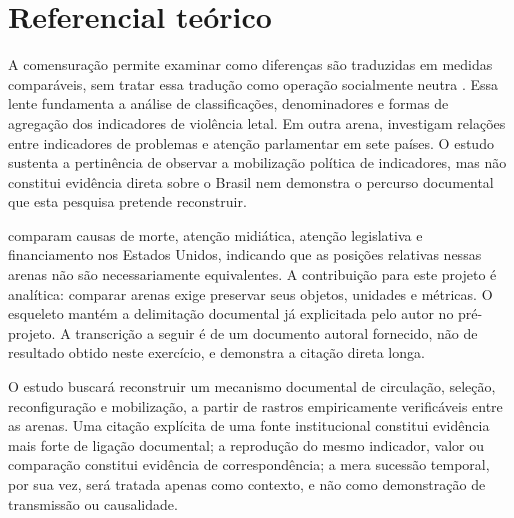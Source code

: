 \section{Referencial teórico}

A comensuração permite examinar como diferenças são traduzidas em medidas comparáveis, sem tratar essa tradução como operação socialmente neutra \cite{espeland1998comensuracao}. Essa lente fundamenta a análise de classificações, denominadores e formas de agregação dos indicadores de violência letal. Em outra arena,  investigam relações entre indicadores de problemas e atenção parlamentar em sete países. O estudo sustenta a pertinência de observar a mobilização política de indicadores, mas não constitui evidência direta sobre o Brasil nem demonstra o percurso documental que esta pesquisa pretende reconstruir.

 comparam causas de morte, atenção midiática, atenção legislativa e financiamento nos Estados Unidos, indicando que as posições relativas nessas arenas não são necessariamente equivalentes. A contribuição para este projeto é analítica: comparar arenas exige preservar seus objetos, unidades e métricas. O esqueleto mantém a delimitação documental já explicitada pelo autor no pré-projeto. A transcrição a seguir é de um documento autoral fornecido, não de resultado obtido neste exercício, e demonstra a citação direta longa.

\begin{citacao}
O estudo buscará reconstruir um mecanismo documental de circulação, seleção, reconfiguração e mobilização, a partir de rastros empiricamente verificáveis entre as arenas. Uma citação explícita de uma fonte institucional constitui evidência mais forte de ligação documental; a reprodução do mesmo indicador, valor ou comparação constitui evidência de correspondência; a mera sucessão temporal, por sua vez, será tratada apenas como contexto, e não como demonstração de transmissão ou causalidade. \cite[p.~10]{santos2026preprojeto}
\end{citacao}
